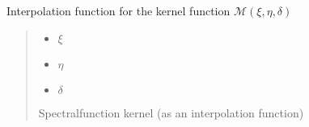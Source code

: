 \documentclass[letterpaper,10pt,english]{sphinxmanual}
\begin{document}
\begin{fulllineitems}
\label{\detokenize{diffsph.spectra:diffsph.spectra.synchrotron.Mst}}
\pysigstartsignatures
{}
\pysigstopsignatures
\sphinxAtStartPar
Interpolation function for the kernel function \(\hat{\mathcal M}(\xi,\eta,\delta)\)
\begin{quote}\begin{description}
\begin{itemize}
\item {} 
\sphinxAtStartPar
{} \textendash{} \(\xi\)

\item {} 
\sphinxAtStartPar
{} \textendash{} \(\eta\)

\item {} 
\sphinxAtStartPar
{} \textendash{} \(\delta\)

\end{itemize}

\sphinxAtStartPar
Spectral\sphinxhyphen{}function kernel (as an interpolation function)

\end{description}\end{quote}

\end{fulllineitems}

\end{document}
